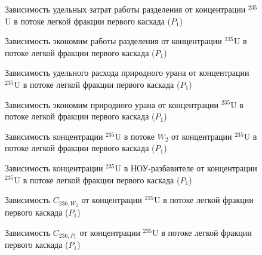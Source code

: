 \begin{figure}[ht]
    \centering
    \begin{minipage}{.5\textwidth}
        \centering
        
  \caption{{Зависимость удельных затрат работы разделения от концентрации $^{235}$U в потоке легкой фракции первого каскада ($P_1$){\label{SWP1}}}}
  \end{minipage}%
    \begin{minipage}{.5\textwidth}
      \centering
      
\caption{{Зависимость экономим работы разделения от концентрации $^{235}$U в потоке легкой фракции первого каскада ($P_1$){\label{SW_lP1}}}}
    \end{minipage}
\end{figure}

\begin{figure}[ht]
    \centering
    \begin{minipage}{.5\textwidth}
        \centering
        
  \caption{{Зависимость удельного расхода природного урана от концентрации $^{235}$U в потоке легкой фракции первого каскада ($P_1$){\label{FnuP1}}}}
  \end{minipage}%
    \begin{minipage}{.5\textwidth}
      \centering
      
\caption{{Зависимость экономим природного урана от концентрации $^{235}$U в потоке легкой фракции первого каскада ($P_1$){\label{pFoP1}}}}
    \end{minipage}
\end{figure}


\begin{figure}[ht]
    \centering
    \begin{minipage}{.5\textwidth}
      \centering
      
\caption{{Зависимость концентрации $^{235}$U в потоке $W_2$ от концентрации $^{235}$U в потоке легкой фракции первого каскада ($P_1$){\label{C235W2}}}}
    \end{minipage}%
    \begin{minipage}{.5\textwidth}
      \centering
      
\caption{{Зависимость концентрации $^{235}$U в НОУ-разбавителе от концентрации $^{235}$U в потоке легкой фракции первого каскада ($P_1$){\label{C235P0}}}}
\end{minipage}
\end{figure}

\begin{figure}[ht]
    \centering
    \begin{minipage}{.5\textwidth}
      \centering
      
      \caption{{Зависимость $C_{236,W_2}$ от концентрации $^{235}$U в потоке легкой фракции первого каскада ($P_1$){\label{C236W2}}}}
    \end{minipage}%
    \begin{minipage}{.5\textwidth}
      \centering
      
      \caption{{Зависимость $C_{236,P_1}$ от концентрации $^{235}$U в потоке легкой фракции первого каскада ($P_1$){\label{C236P1}}}}
  \end{minipage}
  \end{figure}


